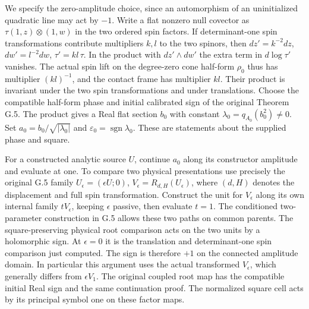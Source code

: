 \documentclass[
  english,
  11pt,
  reqno]{amsart}
\begin{document}
We specify the zero-amplitude choice, since an automorphism of an
uninitialized quadratic line may act by \(-1\). Write a flat nonzero
null covector as \(\tau(1,z)\otimes(1,w)\) in the two ordered spin
factors. If determinant-one spin transformations contribute multipliers
\(k,l\) to the two spinors, then \(dz'=k^{-2}dz\), \(dw'=l^{-2}dw\),
\(\tau'=kl\,\tau\). In the product with \(dz'\wedge dw'\) the extra term
in \(d\log\tau'\) vanishes. The actual spin lift on the degree-zero cone
half-form \(\rho_0\) thus has multiplier \((kl)^{-1}\), and the contact
frame has multiplier \(kl\). Their product is invariant under the two
spin transformations and under translations. Choose the compatible
half-form phase and initial calibrated sign of the original Theorem G.5.
The product gives a Real flat section \(b_0\) with constant
\(\lambda_0=q_{A_0}(b_0^2)\ne0\). Set \(a_0=b_0/\sqrt{|\lambda_0|}\) and
\(\varepsilon_0=\operatorname{sgn}\lambda_0\). These are statements
about the supplied phase and square.

For a constructed analytic source \(U\), continue \(a_0\) along its
constructor amplitude and evaluate at one. To compare two physical
presentations use precisely the original G.5 family
\(U_\epsilon=(\epsilon U;0)\), \(V_\epsilon=R_{d,H}(U_\epsilon)\), where
\((d,H)\) denotes the displacement and full spin transformation.
Construct the unit for \(V_\epsilon\) along its own internal family
\(tV_\epsilon\), keeping \(\epsilon\) passive, then evaluate \(t=1\).
The conditioned two-parameter construction in G.5 allows these two paths
on common parents. The square-preserving physical root comparison acts
on the two units by a holomorphic sign. At \(\epsilon=0\) it is the
translation and determinant-one spin comparison just computed. The sign
is therefore \(+1\) on the connected amplitude domain. In particular
this argument uses the actual transformed \(V_\epsilon\), which
generally differs from \(\epsilon V_1\). The original coupled root map
has the compatible initial Real sign and the same continuation proof.
The normalized square cell acts by its principal symbol one on these
factor maps.
\end{document}
